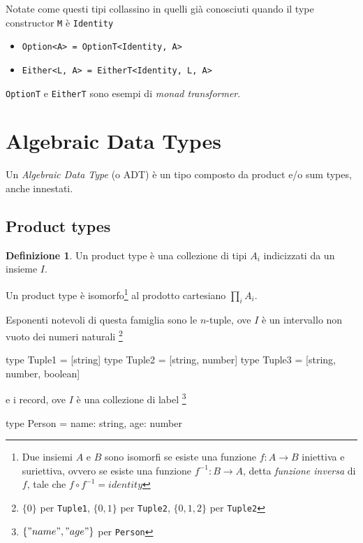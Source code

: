\documentclass[12pt]{article}
\theoremstyle{definition}
\newtheorem{definition}{Definizione}[section]
\newenvironment{code}
  {\vspace{0.5cm} \VerbatimEnvironment\begin{typescriptcode}}
  {\end{typescriptcode} \vspace{0.2cm}}
\begin{document}
Notate come questi tipi collassino in quelli già conosciuti quando il type constructor \texttt{M} è \texttt{Identity}

\begin{itemize}
  \item \texttt{Option<A> = OptionT<Identity, A>}
  \item \texttt{Either<L, A> = EitherT<Identity, L, A>}
\end{itemize}

\texttt{OptionT} e \texttt{EitherT} sono esempi di \emph{monad transformer}.

\newpage

\section{Algebraic Data Types}

Un \emph{Algebraic Data Type} (o ADT) è un tipo composto da product e/o sum types, anche innestati.

\subsection{Product types}

\begin{definition}
Un product type è una collezione di tipi $A_i$ indicizzati da un insieme $I$.
\end{definition}

Un product type è isomorfo\footnote{Due insiemi $A$ e $B$ sono isomorfi se esiste una funzione $f: A \rightarrow B$ iniettiva e suriettiva,
ovvero se esiste una funzione $f^{-1}: B \rightarrow A$, detta \emph{funzione inversa} di $f$, tale che $f \circ f^{-1} = identity$}
al prodotto cartesiano $\prod_i A_i$.

Esponenti notevoli di questa famiglia sono le $n$-tuple, ove $I$ è un intervallo non vuoto dei numeri naturali
\footnote{$\{0\}$ per \texttt{Tuple1}, $\{0, 1\}$ per \texttt{Tuple2}, $\{0, 1, 2\}$ per \texttt{Tuple2}}

\begin{code}
type Tuple1 = [string]
type Tuple2 = [string, number]
type Tuple3 = [string, number, boolean]
\end{code}

e i record, ove $I$ è una collezione di label
\footnote{$\{ "name", "age" \}$ per \texttt{Person}}

\begin{code}
type Person = {
  name: string,
  age: number
}
\end{code}
\end{document}
